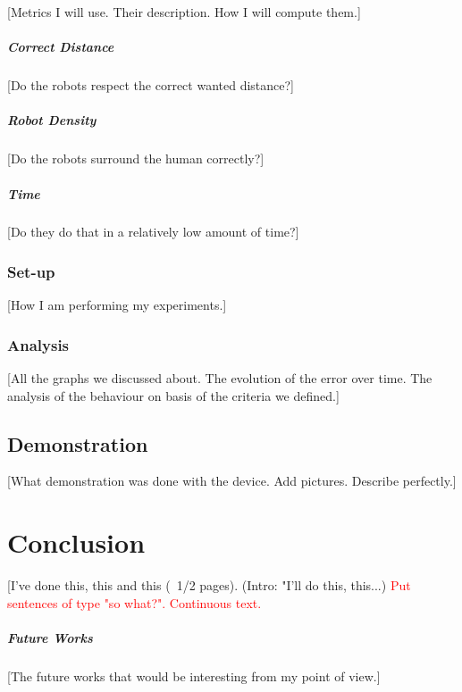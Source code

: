 \documentclass[oneside, a4paper, 12pt]{memoir}
\begin{document}
		[Metrics I will use. Their description. How I will compute them.]
		
			\paragraph{Correct Distance}
			
			[Do the robots respect the correct wanted distance?]
			
			\paragraph{Robot Density}
			
			[Do the robots surround the human correctly?]
			
			\paragraph{Time}
			
			[Do they do that in a relatively low amount of time?]
			
		\subsection{Set-up}
		
		[How I am performing my experiments.]
		
		\subsection{Analysis}
		
		[All the graphs we discussed about. The evolution of the error over time. The analysis of the behaviour on basis of the criteria we defined.]
		
	\section{Demonstration}
	
	[What demonstration was done with the device. Add pictures. Describe perfectly.]

\chapter{Conclusion}

[I've done this, this and this (~1/2 pages). (Intro: "I'll do this, this...) \textcolor{red}{Put sentences of type "so what?". Continuous text.}

	\paragraph{Future Works}
	[The future works that would be interesting from my point of view.]
	
\end{document}
